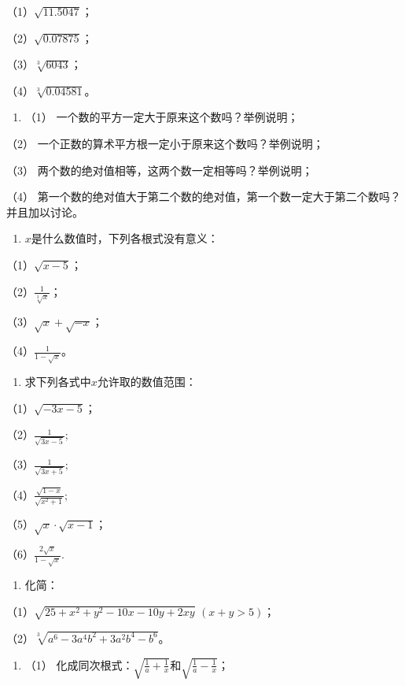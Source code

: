 （1）\(\sqrt{11.5047}\)；

（2）\(\sqrt{0.07875}\)；

（3）\(\sqrt[3]{6043}\)；

（4）\(\sqrt[3]{0.04581}\)。

\begin{enumerate}[start=22]
\item
  （1） 一个数的平方一定大于原来这个数吗？举例说明；
\end{enumerate}

（2） 一个正数的算术平方根一定小于原来这个数吗？举例说明；

（3） 两个数的绝对值相等，这两个数一定相等吗？举例说明；

（4）
第一个数的绝对值大于第二个数的绝对值，第一个数一定大于第二个数吗？并且加以讨论。

\begin{enumerate}[start=23]
\item
  \(x\)是什么数值时，下列各根式没有意义：
\end{enumerate}

（1）\(\sqrt{x - 5}\)；

（2）\(\frac{1}{\sqrt[3]{x}}\)；

（3）\(\sqrt{x} + \sqrt{-x}\)；

（4）\(\frac{1}{1 - \sqrt{x}}\)。

\begin{enumerate}[start=24]
\item
  求下列各式中\(x\)允许取的数值范围：
\end{enumerate}

（1）\(\sqrt{-3x - 5}\)；

（2）\(\frac{1}{\sqrt{3x - 5}};\)

（3）\(\frac{1}{\sqrt{3x + 5}};\)

（4）\(\frac{\sqrt{1 - x}}{\sqrt{x^2 + 1}};\)

（5）\(\sqrt{x} \cdot \sqrt{x - 1}\)；

（6）\(\frac{2\sqrt{x}}{1 - \sqrt{x}}.\)

\begin{enumerate}[start=25]
\item
  化简：
\end{enumerate}

（1）\(\sqrt{25 + x^2 + y^2 - 10x - 10y + 2xy}\) \((x + y > 5)\)；

（2）\(\sqrt[3]{a^6 - 3a^4b^2 + 3a^2b^4 - b^6}\)。

\begin{enumerate}[start=26]
\item
  （1）
  化成同次根式：\(\sqrt{\frac{1}{a} + \frac{1}{x}}\)和\(\sqrt{\frac{1}{a} - \frac{1}{x}}\)；
\end{enumerate}

